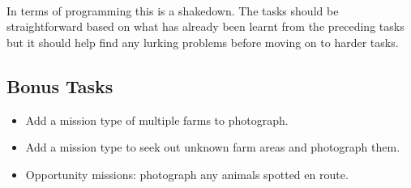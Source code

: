 \documentclass[11pt]{book}
\begin{document}
\paragraph{} In terms of programming this is a shakedown. The tasks should be straightforward based on what has already been learnt from the preceding tasks but it should help find any lurking problems before moving on to harder tasks.

\subsection{Bonus Tasks}

\begin{itemize}
\item Add a mission type of multiple farms to photograph.
\item Add a mission type to seek out unknown farm areas and photograph them.
\item Opportunity missions: photograph any animals spotted en route.
\end{itemize}
\end{document}
